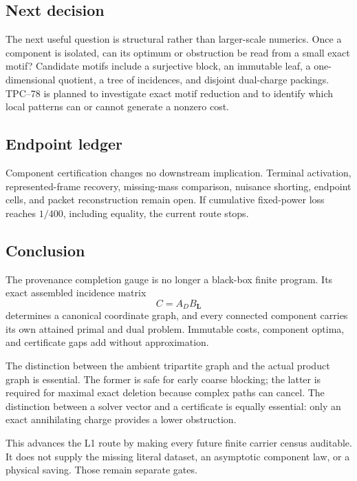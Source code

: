 \subsection{Next decision}

The next useful question is structural rather than larger-scale
numerics. Once a component is isolated, can its optimum or obstruction
be read from a small exact motif? Candidate motifs include a surjective
block, an immutable leaf, a one-dimensional quotient, a tree of
incidences, and disjoint dual-charge packings. TPC--78 is planned to
investigate exact motif reduction and to identify which local patterns
can or cannot generate a nonzero cost.

\subsection{Endpoint ledger}

Component certification changes no downstream implication. Terminal
activation, represented-frame recovery, missing-mass comparison,
nuisance shorting, endpoint cells, and packet reconstruction remain
open. If cumulative fixed-power loss reaches \(1/400\), including
equality, the current route stops.

\subsection{Conclusion}

The provenance completion gauge is no longer a black-box finite
program. Its exact assembled incidence matrix
\[
 C=A_DB_{\boldsymbol L}
\]
determines a canonical coordinate graph, and every connected component
carries its own attained primal and dual problem. Immutable costs,
component optima, and certificate gaps add without approximation.

The distinction between the ambient tripartite graph and the actual
product graph is essential. The former is safe for early coarse
blocking; the latter is required for maximal exact deletion because
complex paths can cancel. The distinction between a solver vector and a
certificate is equally essential: only an exact annihilating charge
provides a lower obstruction.

This advances the L1 route by making every future finite carrier census
auditable. It does not supply the missing literal dataset, an
asymptotic component law, or a physical saving. Those remain separate
gates.
